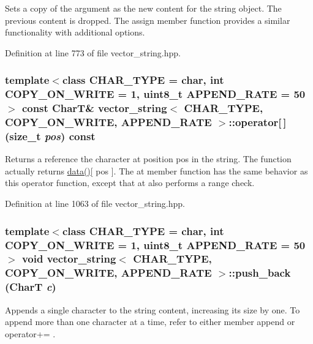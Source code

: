 Sets a copy of the argument as the new content for the string object. The previous content is dropped. The assign member function provides a similar functionality with additional options. 

Definition at line 773 of file vector\_\-string.hpp.\hypertarget{classvector__string_e845c248f0acdf57afc6628f43cbe14a}{
\subsubsection[{operator[]}]{\setlength{\rightskip}{0pt plus 5cm}template$<$class CHAR\_\-TYPE  = char, int COPY\_\-ON\_\-WRITE = 1, uint8\_\-t APPEND\_\-RATE = 50$>$ const CharT\& {\bf vector\_\-string}$<$ CHAR\_\-TYPE, COPY\_\-ON\_\-WRITE, APPEND\_\-RATE $>$::operator\mbox{[}$\,$\mbox{]} (size\_\-t {\em pos}) const}}
\label{classvector__string_e845c248f0acdf57afc6628f43cbe14a}


Returns a reference the character at position pos in the string. The function actually returns \hyperlink{classvector__string_96e3871846c162930623048ce8e053f1}{data()}\mbox{[} pos \mbox{]}. The at member function has the same behavior as this operator function, except that at also performs a range check. 

Definition at line 1063 of file vector\_\-string.hpp.\hypertarget{classvector__string_91e53ed1638e78aecd9ec100949a46ef}{
\subsubsection[{push\_\-back}]{\setlength{\rightskip}{0pt plus 5cm}template$<$class CHAR\_\-TYPE  = char, int COPY\_\-ON\_\-WRITE = 1, uint8\_\-t APPEND\_\-RATE = 50$>$ void {\bf vector\_\-string}$<$ CHAR\_\-TYPE, COPY\_\-ON\_\-WRITE, APPEND\_\-RATE $>$::push\_\-back (CharT {\em c})}}
\label{classvector__string_91e53ed1638e78aecd9ec100949a46ef}


Appends a single character to the string content, increasing its size by one. To append more than one character at a time, refer to either member append or operator+= . 

